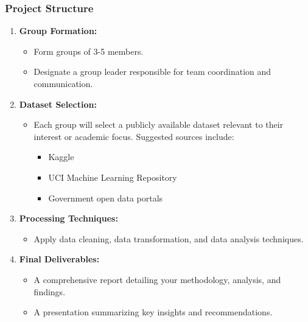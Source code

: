 \documentclass[aspectratio=169]{beamer}
\begin{document}
\begin{frame}[fragile]
    \frametitle{Project Structure}
    \begin{enumerate}
        \item \textbf{Group Formation:}
        \begin{itemize}
            \item Form groups of 3-5 members.
            \item Designate a group leader responsible for team coordination and communication.
        \end{itemize}
        
        \item \textbf{Dataset Selection:}
        \begin{itemize}
            \item Each group will select a publicly available dataset relevant to their interest or academic focus. Suggested sources include:
            \begin{itemize}
                \item Kaggle
                \item UCI Machine Learning Repository
                \item Government open data portals
            \end{itemize}
        \end{itemize}
        
        \item \textbf{Processing Techniques:}
        \begin{itemize}
            \item Apply data cleaning, data transformation, and data analysis techniques.
        \end{itemize}
        
        \item \textbf{Final Deliverables:}
        \begin{itemize}
            \item A comprehensive report detailing your methodology, analysis, and findings.
            \item A presentation summarizing key insights and recommendations.
        \end{itemize}
    \end{enumerate}
\end{frame}
\end{document}
